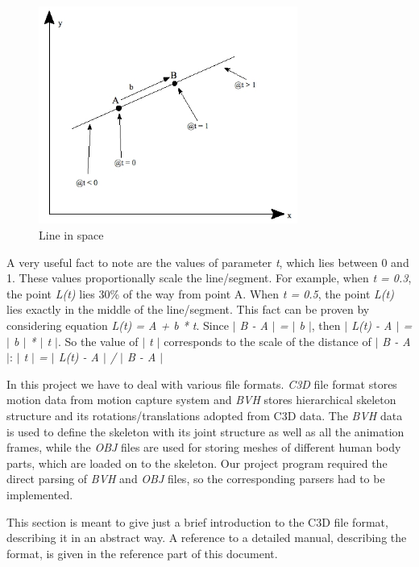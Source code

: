 \documentclass[times, 10pt,twocolumn]{article}
\begin{document}
\begin{figure}[H]
  \caption{Line in space}
  \label{line_in_space}
  \centering
  \includegraphics[width=85mm]{images/lines3d.jpg}
\end{figure}

A very useful fact to note are the values of parameter \emph{t}, which lies between 0 and 1. These values proportionally scale the line/segment. For example, when \emph{t = 0.3}, the point \emph{L(t)} lies 30\% of the way from point A. When \emph{t = 0.5}, the point \emph{L(t)} lies exactly in the middle of the line/segment. This fact can be proven by considering equation \emph{L(t) = A + b * t}. Since \emph{$|$ B - A $|$ = $|$ b $|$}, then \emph{$|$ L(t) - A $|$ = $|$ b $|$ * $|$ t $|$}. So the value of \emph{$|$ t $|$} corresponds to the scale of the distance of \emph{$|$ B - A $|$}: \emph{$|$ t $|$ = $|$ L(t) - A $|$ / $|$ B - A $|$}


\label{data_formats}
In this project we have to deal with various file formats. \emph{C3D} file format stores motion data from motion capture system and \emph{BVH} stores hierarchical skeleton structure and its rotations/translations adopted from C3D data. The \emph{BVH} data is used to define the skeleton with its joint structure as well as all the animation frames, while the \emph{OBJ} files are used for storing meshes of different human body parts, which are loaded on to the skeleton. Our project program required the direct parsing of \emph{BVH} and \emph{OBJ} files, so the corresponding parsers had to be implemented.


This section is meant to give just a brief introduction to the C3D file format, describing it in an abstract way. A reference to a detailed manual, describing the format, is given in the reference part of this document.
\end{document}
